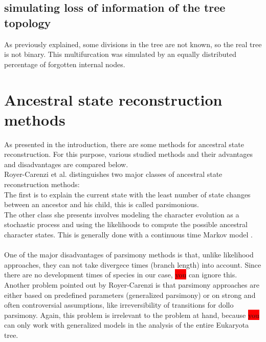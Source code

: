     \subsection{simulating loss of information of the tree topology}
      As previously explained, some divisions in the tree are not known, so the real tree is not binary.
      This multifurcation was simulated by an equally distributed percentage of forgotten internal nodes.

    \section{Ancestral state reconstruction methods}
      As presented in the introduction, there are some methods for ancestral state reconstruction. For 
        this purpose, various studied methods and their advantages and disadvantages are compared below. \\
    
      Royer-Carenzi et al. distinguishes two major classes of ancestral state reconstruction methods: \\
      The first is to explain the current state with the least number of state changes between an 
        ancestor and his child, this is called parsimonious. \\
      The other class she presents involves modeling the character evolution as a stochastic process and 
        using the likelihoods to compute the possible ancestral character states. This is generally done 
        with a continuous time Markov model \cite{RoyerCarenzi2013}. \\

       \\

      One of the major disadvantages of parsimony methods is that, unlike likelihood approaches, they 
        can not take divergece times (branch length) into account. Since there are no development times 
        of species in our case, \colorbox{red}{you} can ignore this. \\
      Another problem pointed out by Royer-Carenzi is that parsimony approaches are either based on 
        predefined parameters (generalized parsimony) or on strong and often controversial assumptions, 
        like irreversibility of transitions for dollo parsimony. Again, this problem is irrelevant to 
        the problem at hand, because \colorbox{red}{you} can only work with generalized models in the 
        analysis of the entire Eukaryota tree. \\

